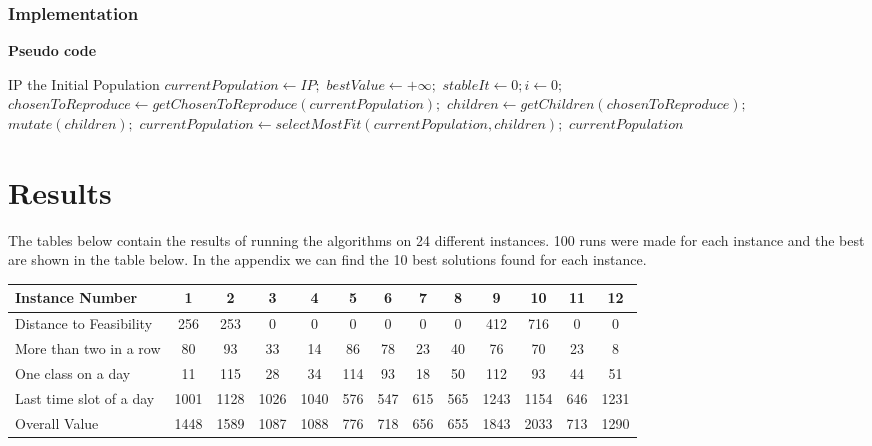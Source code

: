 \documentclass{llncs}
\begin{document}
\subsubsection{Implementation}


\newpage
\textbf{Pseudo code}
\begin{algorithmic}[1]
\Require IP the Initial Population
\State $currentPopulation \leftarrow  IP;$
\State $bestValue \gets +\infty;$
\State $stableIt \gets 0; i \gets 0;$
	\State $chosenToReproduce \leftarrow getChosenToReproduce(currentPopulation);$
	\State $children \leftarrow  getChildren(chosenToReproduce);$
	\State $mutate(children);$
	\State $currentPopulation \gets selectMostFit(currentPopulation,children);$
\EndWhile
\State \Return $currentPopulation$	
	


\end{algorithmic}


\section{Results}

The tables below contain the results of running the algorithms on 24 different instances. 100 runs were made for each instance and the best are shown in the table below. In the appendix we can find the 10 best solutions found for each instance.

\medskip%

\begin{tabular}{l  *{12}{c}}
Instance Number & 1 & 2 & 3 & 4 & 5 & 6 & 7 & 8 & 9 & 10 & 11 & 12 \\
\toprule
Distance to Feasibility & 256 & 253 & 0 & 0 & 0 & 0 & 0 & 0 & 412 & 716 & 0 & 0 \\
More than two in a row & 80 & 93 & 33 & 14 & 86 & 78 & 23 & 40 & 76 & 70 & 23 & 8 \\
One class on a day  & 11 & 115 & 28 & 34 & 114 & 93 & 18 & 50 & 112 & 93 & 44 & 51 \\
Last time slot of a day & 1001 & 1128 & 1026 & 1040 & 576 & 547 & 615 & 565 & 1243 & 1154 & 646 & 1231 \\
\bottomrule
Overall Value & 1448 & 1589 & 1087 & 1088 & 776 & 718 & 656 & 655 & 1843 & 2033 & 713 & 1290 \\


\end{tabular}

\medskip%
\medskip%
\end{document}
